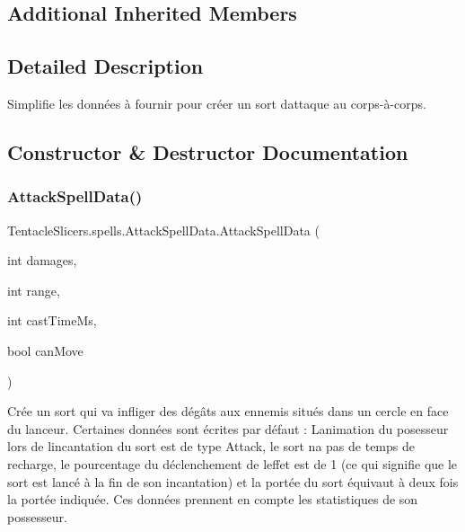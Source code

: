 \subsection*{Additional Inherited Members}


\subsection{Detailed Description}
Simplifie les données à fournir pour créer un sort d\textquotesingle{}attaque au corps-\/à-\/corps. 



\subsection{Constructor \& Destructor Documentation}
\mbox{\label{class_tentacle_slicers_1_1spells_1_1_attack_spell_data_a0e2f1e32eda39e61b4c093d8792928db}} 
\subsubsection{\texorpdfstring{Attack\+Spell\+Data()}{AttackSpellData()}}
{\footnotesize\ttfamily Tentacle\+Slicers.\+spells.\+Attack\+Spell\+Data.\+Attack\+Spell\+Data (\begin{DoxyParamCaption}\item[{int}]{damages,  }\item[{int}]{range,  }\item[{int}]{cast\+Time\+Ms,  }\item[{bool}]{can\+Move }\end{DoxyParamCaption})}



Crée un sort qui va infliger des dégâts aux ennemis situés dans un cercle en face du lanceur. Certaines données sont écrites par défaut \+: L\textquotesingle{}animation du posesseur lors de l\textquotesingle{}incantation du sort est de type Attack, le sort n\textquotesingle{}a pas de temps de recharge, le pourcentage du déclenchement de l\textquotesingle{}effet est de 1 (ce qui signifie que le sort est lancé à la fin de son incantation) et la portée du sort équivaut à deux fois la portée indiquée. Ces données prennent en compte les statistiques de son possesseur. 


